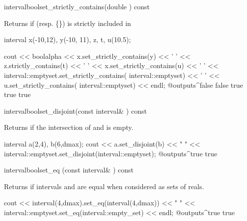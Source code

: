 \documentclass{manual}
\let\emptyset=\varnothing
\begin{document}
\begin{defmethod}{interval}{bool}{set\_strictly\_contains}{(double ) const}
  \begin{operation}
  \end{operation}
Returns  if  (resp. \{\}) is strictly included in 

\begin{example}
interval x(-10,12), y(-10, 11), z, t, u(10.5);

cout << boolalpha
    << x.set_strictly_contains(y) << ' '
    << z.strictly_contains(t)
    << ' ' << x.set_strictly_contains(u) << ' '
    << interval::emptyset.set_strictly_contains(
                                   interval::emptyset)
    << ' ' << u.set_strictly_contains(
                          interval::emptyset) << endl;
@outputs^false false true true true~
\end{example}
\end{defmethod}

\begin{defmethod}{interval}{bool}{set\_disjoint}{(const interval\& ) const}
  \begin{operation}
    \op{$*this\cap I=\emptyset$}
  \end{operation}
Returns  if the intersection of  and  is empty.

\begin{example}
interval a(2,4), b(6,dmax);
cout << a.set_disjoint(b) << " "
     << interval::emptyset.set_disjoint(interval::emptyset);
@outputs^true true~
\end{example}
\end{defmethod}

\begin{defmethod}{interval}{bool}{set\_eq }{(const interval\& ) const}
  \begin{operation}
  \end{operation}
Returns  if intervals  and  are equal
when considered as sets of reals.
\begin{example}
cout << interval(4,dmax).set_eq(interval(4,dmax)) << " "
     << interval::emptyset.set_eq(interval::empty_set) << endl;
@outputs^true true~
\end{example}
\end{defmethod}
\end{document}
